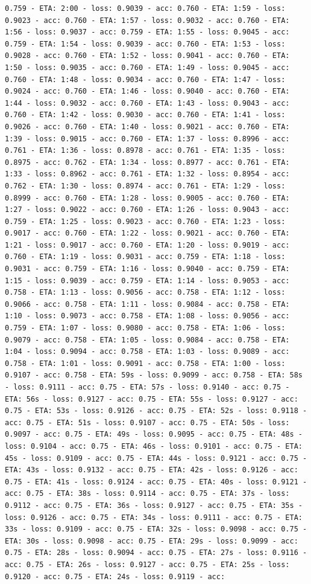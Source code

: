 \documentclass[11pt]{article}
\begin{document}
\begin{Verbatim}[commandchars=\\\{\}]
0.759 - ETA: 2:00 - loss: 0.9039 - acc: 0.760 - ETA: 1:59 - loss: 0.9023 - acc: 0.760 - ETA: 1:57 - loss: 0.9032 - acc: 0.760 - ETA: 1:56 - loss: 0.9037 - acc: 0.759 - ETA: 1:55 - loss: 0.9045 - acc: 0.759 - ETA: 1:54 - loss: 0.9039 - acc: 0.760 - ETA: 1:53 - loss: 0.9028 - acc: 0.760 - ETA: 1:52 - loss: 0.9041 - acc: 0.760 - ETA: 1:50 - loss: 0.9035 - acc: 0.760 - ETA: 1:49 - loss: 0.9045 - acc: 0.760 - ETA: 1:48 - loss: 0.9034 - acc: 0.760 - ETA: 1:47 - loss: 0.9024 - acc: 0.760 - ETA: 1:46 - loss: 0.9040 - acc: 0.760 - ETA: 1:44 - loss: 0.9032 - acc: 0.760 - ETA: 1:43 - loss: 0.9043 - acc: 0.760 - ETA: 1:42 - loss: 0.9030 - acc: 0.760 - ETA: 1:41 - loss: 0.9026 - acc: 0.760 - ETA: 1:40 - loss: 0.9021 - acc: 0.760 - ETA: 1:39 - loss: 0.9015 - acc: 0.760 - ETA: 1:37 - loss: 0.8996 - acc: 0.761 - ETA: 1:36 - loss: 0.8978 - acc: 0.761 - ETA: 1:35 - loss: 0.8975 - acc: 0.762 - ETA: 1:34 - loss: 0.8977 - acc: 0.761 - ETA: 1:33 - loss: 0.8962 - acc: 0.761 - ETA: 1:32 - loss: 0.8954 - acc: 0.762 - ETA: 1:30 - loss: 0.8974 - acc: 0.761 - ETA: 1:29 - loss: 0.8999 - acc: 0.760 - ETA: 1:28 - loss: 0.9005 - acc: 0.760 - ETA: 1:27 - loss: 0.9022 - acc: 0.760 - ETA: 1:26 - loss: 0.9043 - acc: 0.759 - ETA: 1:25 - loss: 0.9023 - acc: 0.760 - ETA: 1:23 - loss: 0.9017 - acc: 0.760 - ETA: 1:22 - loss: 0.9021 - acc: 0.760 - ETA: 1:21 - loss: 0.9017 - acc: 0.760 - ETA: 1:20 - loss: 0.9019 - acc: 0.760 - ETA: 1:19 - loss: 0.9031 - acc: 0.759 - ETA: 1:18 - loss: 0.9031 - acc: 0.759 - ETA: 1:16 - loss: 0.9040 - acc: 0.759 - ETA: 1:15 - loss: 0.9039 - acc: 0.759 - ETA: 1:14 - loss: 0.9053 - acc: 0.758 - ETA: 1:13 - loss: 0.9056 - acc: 0.758 - ETA: 1:12 - loss: 0.9066 - acc: 0.758 - ETA: 1:11 - loss: 0.9084 - acc: 0.758 - ETA: 1:10 - loss: 0.9073 - acc: 0.758 - ETA: 1:08 - loss: 0.9056 - acc: 0.759 - ETA: 1:07 - loss: 0.9080 - acc: 0.758 - ETA: 1:06 - loss: 0.9079 - acc: 0.758 - ETA: 1:05 - loss: 0.9084 - acc: 0.758 - ETA: 1:04 - loss: 0.9094 - acc: 0.758 - ETA: 1:03 - loss: 0.9089 - acc: 0.758 - ETA: 1:01 - loss: 0.9091 - acc: 0.758 - ETA: 1:00 - loss: 0.9107 - acc: 0.758 - ETA: 59s - loss: 0.9099 - acc: 0.758 - ETA: 58s - loss: 0.9111 - acc: 0.75 - ETA: 57s - loss: 0.9140 - acc: 0.75 - ETA: 56s - loss: 0.9127 - acc: 0.75 - ETA: 55s - loss: 0.9127 - acc: 0.75 - ETA: 53s - loss: 0.9126 - acc: 0.75 - ETA: 52s - loss: 0.9118 - acc: 0.75 - ETA: 51s - loss: 0.9107 - acc: 0.75 - ETA: 50s - loss: 0.9097 - acc: 0.75 - ETA: 49s - loss: 0.9095 - acc: 0.75 - ETA: 48s - loss: 0.9104 - acc: 0.75 - ETA: 46s - loss: 0.9101 - acc: 0.75 - ETA: 45s - loss: 0.9109 - acc: 0.75 - ETA: 44s - loss: 0.9121 - acc: 0.75 - ETA: 43s - loss: 0.9132 - acc: 0.75 - ETA: 42s - loss: 0.9126 - acc: 0.75 - ETA: 41s - loss: 0.9124 - acc: 0.75 - ETA: 40s - loss: 0.9121 - acc: 0.75 - ETA: 38s - loss: 0.9114 - acc: 0.75 - ETA: 37s - loss: 0.9112 - acc: 0.75 - ETA: 36s - loss: 0.9127 - acc: 0.75 - ETA: 35s - loss: 0.9126 - acc: 0.75 - ETA: 34s - loss: 0.9111 - acc: 0.75 - ETA: 33s - loss: 0.9109 - acc: 0.75 - ETA: 32s - loss: 0.9098 - acc: 0.75 - ETA: 30s - loss: 0.9098 - acc: 0.75 - ETA: 29s - loss: 0.9099 - acc: 0.75 - ETA: 28s - loss: 0.9094 - acc: 0.75 - ETA: 27s - loss: 0.9116 - acc: 0.75 - ETA: 26s - loss: 0.9127 - acc: 0.75 - ETA: 25s - loss: 0.9120 - acc: 0.75 - ETA: 24s - loss: 0.9119 - acc: 
\end{Verbatim}
\end{document}
